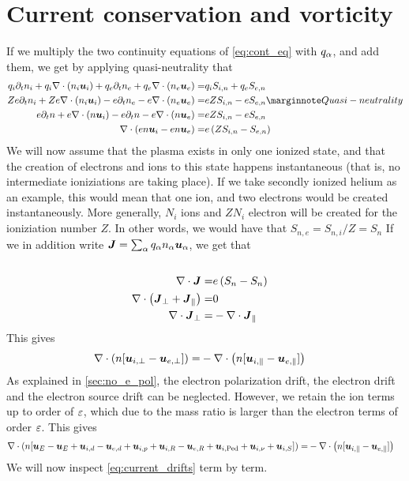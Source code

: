 \section{Current conservation and vorticity}
%
If we multiply the two continuity equations of \cref{eq:cont_eq} with $q_\alpha$, and add them, we get by applying quasi-neutrality that
%
\begin{align*}
    q_i\partial_t n_i + q_i\div (n_i \ve{u}_i)
    + q_e\partial_t n_e + q_e\div (n_e \ve{u}_e)
    =&
    q_iS_{i,n} + q_eS_{e,n}
    \\
    Ze\partial_t n_i + Ze\div (n_i \ve{u}_i)
    - e\partial_t n_e - e\div (n_e \ve{u}_e)
    =&
    eZS_{i,n} - eS_{e,n}
    \note{Quasi-neutrality}
    \\
    e\partial_t n + e\div (n \ve{u}_i)
    - e\partial_t n - e\div (n \ve{u}_e)
    =&
    eZS_{i,n} - eS_{e,n}
    \\
    \div (en \ve{u}_i - en \ve{u}_e) =&
    e\L(ZS_{i,n} - S_{e,n}\R)
\end{align*}
%
We will now assume that the plasma exists in only one ionized state, and that the creation of electrons and ions to this state happens instantaneous (that is, no intermediate ioniziations are taking place).
If we take secondly ionized helium as an example, this would mean that one ion, and two electrons would be created instantaneously.
More generally, $N_i$ ions and $ZN_i$ electron will be created for the ioniziation number $Z$.
In other words, we would have that $S_{n,e}=S_{n,i}/Z=S_n$
If we in addition write $\boldsymbol{J} = \sum_{\alpha}q_\alpha n_\alpha\boldsymbol{u}_\alpha$, we get that
%
\begin{align*}
    \\
    \nabla\cdot \boldsymbol{J} =&
    e\left(S_{n} - S_{n}\right)
    \\
    \nabla\cdot \left( \boldsymbol{J}_\perp + \boldsymbol{J}_\|\right)=& 0
    \\
    \nabla\cdot \boldsymbol{J}_\perp =& -\nabla\cdot \boldsymbol{J}_\|
\end{align*}
%
This gives
%
\begin{align*}
    \nabla\cdot \left( n [\boldsymbol{u}_{i,\perp} - \boldsymbol{u}_{e,\perp}] \right) =&
    -\nabla\cdot \left(n [\boldsymbol{u}_{i,\|} - \boldsymbol{u}_{e,\|}]\right)
\end{align*}
%
As explained in \cref{sec:no_e_pol}, the electron polarization drift, the electron drift and the electron source drift can be neglected.
However, we retain the ion terms up to order of $\varepsilon$, which due to the mass ratio is larger than the electron terms of order $\varepsilon$.
This gives
%
\begin{align}
    \nabla\cdot \left( n [
   \boldsymbol{u}_{E} - \boldsymbol{u}_{E}
  +\boldsymbol{u}_{i,d} - \boldsymbol{u}_{e,d}
  +\boldsymbol{u}_{i,p}
  +\boldsymbol{u}_{i,R} - \boldsymbol{u}_{e,R}
  +\boldsymbol{u}_{i,\text{Ped}}
  +\boldsymbol{u}_{i,\nu}
  +\boldsymbol{u}_{i,S}
  ] \right) =&
  -\nabla\cdot \left(n [\boldsymbol{u}_{i,\|} - \boldsymbol{u}_{e,\|}]\right)
  \label{eq:current_drifts}
\end{align}
%
We will now inspect \cref{eq:current_drifts} term by term.

